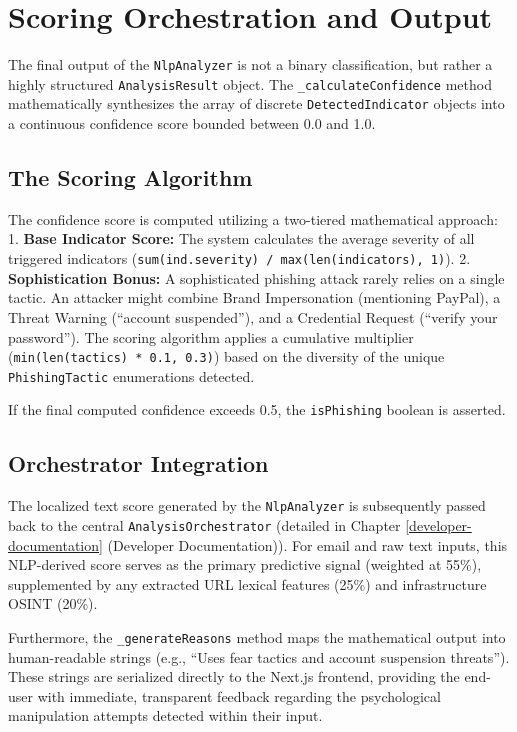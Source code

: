 \section{Scoring Orchestration and
Output}\label{scoring-orchestration-and-output}

The final output of the \texttt{NlpAnalyzer} is not a binary
classification, but rather a highly structured \texttt{AnalysisResult}
object. The \texttt{\_calculateConfidence} method mathematically
synthesizes the array of discrete \texttt{DetectedIndicator} objects
into a continuous confidence score bounded between 0.0 and 1.0.

\subsection{The Scoring Algorithm}\label{the-scoring-algorithm}

The confidence score is computed utilizing a two-tiered mathematical
approach: 1. \textbf{Base Indicator Score:} The system calculates the
average severity of all triggered indicators
(\texttt{sum(ind.severity)\ /\ max(len(indicators),\ 1)}). 2.
\textbf{Sophistication Bonus:} A sophisticated phishing attack rarely
relies on a single tactic. An attacker might combine Brand Impersonation
(mentioning PayPal), a Threat Warning (``account suspended''), and a
Credential Request (``verify your password''). The scoring algorithm
applies a cumulative multiplier
(\texttt{min(len(tactics)\ *\ 0.1,\ 0.3)}) based on the diversity of the
unique \texttt{PhishingTactic} enumerations detected.

If the final computed confidence exceeds 0.5, the \texttt{isPhishing}
boolean is asserted.

\subsection{Orchestrator
Integration}\label{orchestrator-integration}

The localized text score generated by the \texttt{NlpAnalyzer} is
subsequently passed back to the central \texttt{AnalysisOrchestrator}
(detailed in Chapter \ref{developer-documentation} (Developer Documentation)). For email and raw text inputs, this NLP-derived
score serves as the primary predictive signal (weighted at 55\%),
supplemented by any extracted URL lexical features (25\%) and
infrastructure OSINT (20\%).

Furthermore, the \texttt{\_generateReasons} method maps the mathematical
output into human-readable strings (e.g., ``Uses fear tactics and
account suspension threats''). These strings are serialized directly to
the Next.js frontend, providing the end-user with immediate, transparent
feedback regarding the psychological manipulation attempts detected
within their input.

